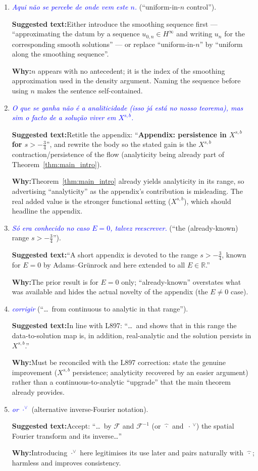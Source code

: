 \documentclass[11pt]{article}
\newcommand{\R}{\mathbb{R}}
\newcommand{\F}{\mathcal{F}}
\newcommand{\com}[1]{\textit{\textcolor{blue}{#1}}}
\newcommand{\sugg}[1]{\par\smallskip\textbf{Suggested text:}\quad #1}
\newcommand{\why}[1]{\par\smallskip\textbf{Why:}\quad #1\par\medskip}
\begin{document}
\begin{enumerate}[leftmargin=*]
\item[\textbf{L893}] \com{Aqui n\~ao se percebe de onde vem este $n$.}
(``uniform-in-$n$ control'').
\sugg{Either introduce the smoothing sequence first --- ``approximating the
datum by a sequence $u_{0,n}\in H^\infty$ and writing $u_n$ for the
corresponding smooth solutions'' --- or replace ``uniform-in-$n$'' by
``uniform along the smoothing sequence''.}
\why{$n$ appears with no antecedent; it is the index of the smoothing
approximation used in the density argument. Naming the sequence before using
$n$ makes the sentence self-contained.}

\item[\textbf{L897}] \com{O que se ganha n\~ao \'e a analiticidade (isso j\'a
est\'a no nosso teorema), mas sim o facto de a solu\c c\~ao viver em
$X^{s,b}$.}
\sugg{Retitle the appendix: ``\textbf{Appendix: persistence in $X^{s,b}$ for
$s>-\tfrac34$}'', and rewrite the body so the stated gain is the $X^{s,b}$
contraction/persistence of the flow (analyticity being already part of
Theorem~\ref{thm:main_intro}).}
\why{Theorem~\ref{thm:main_intro} already yields analyticity in its range, so
advertising ``analyticity'' as the appendix's contribution is misleading. The
real added value is the stronger functional setting ($X^{s,b}$), which should
headline the appendix.}

\item[\textbf{L898 (a)}] \com{S\'o era conhecido no caso $E=0$, talvez
reescrever.} (``the (already-known) range $s>-\tfrac34$'').
\sugg{``A short appendix is devoted to the range $s>-\tfrac34$, known for
$E=0$ by Adams--Gr\"unrock \cite{adamsgrunrock} and here extended to all
$E\in\R$.''}
\why{The prior result is for $E=0$ only; ``already-known'' overstates what was
available and hides the actual novelty of the appendix (the $E\neq0$ case).}

\item[\textbf{L898 (b)}] \com{corrigir} (``\dots\ from continuous to analytic
in that range'').
\sugg{In line with L897: ``\dots\ and shows that in this range the
data-to-solution map is, in addition, real-analytic and the solution persists
in $X^{s,b}$.''}
\why{Must be reconciled with the L897 correction: state the genuine
improvement ($X^{s,b}$ persistence; analyticity recovered by an easier
argument) rather than a continuous-to-analytic ``upgrade'' that the main
theorem already provides.}

\item[\textbf{L909 (a)}] \com{or $\cdot^\vee$} (alternative inverse-Fourier
notation).
\sugg{Accept: ``\dots\ by $\F$ and $\F^{-1}$ (or $\widehat{\,\cdot\,}$ and
$\,\cdot\,^{\vee}$) the spatial Fourier transform and its inverse\dots''}
\why{Introducing $\cdot^\vee$ here legitimises its use later and pairs
naturally with $\widehat{\,\cdot\,}$; harmless and improves consistency.}


\end{enumerate}
\end{document}
